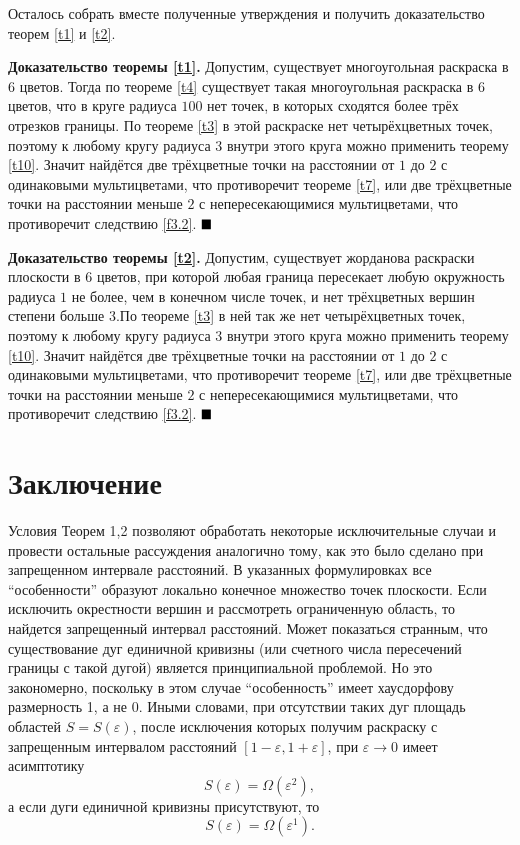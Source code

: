 \documentclass[12pt,a4paper]{article}
\renewcommand{\qed}{$\blacksquare \vspace{5mm}$}
\begin{document}
Осталось собрать вместе полученные утверждения и получить доказательство теорем \ref{t1} и \ref{t2}.

\textbf{Доказательство теоремы \ref{t1}.} Допустим, существует многоугольная раскраска в $6$ цветов. Тогда по теореме \ref{t4} существует такая многоугольная раскраска в $6$ цветов, что в круге радиуса $100$ нет точек, в которых сходятся более трёх отрезков границы. По теореме \ref{t3} в этой раскраске нет четырёхцветных точек, поэтому к любому кругу радиуса $3$ внутри этого круга можно применить теорему \ref{t10}. Значит найдётся две трёхцветные точки на расстоянии от $1$ до $2$ с одинаковыми мультицветами, что противоречит теореме \ref{t7}, или две трёхцветные точки на расстоянии меньше $2$ с непересекающимися мультицветами, что противоречит следствию \ref{f3.2}. \qed

\textbf{Доказательство теоремы \ref{t2}.} Допустим, существует жорданова раскраски плоскости в $6$ цветов, при которой любая граница пересекает любую окружность радиуса $1$ не более, чем в конечном числе точек, и нет трёхцветных вершин степени больше $3$.По теореме \ref{t3} в ней так же нет четырёхцветных точек, поэтому к любому кругу радиуса $3$ внутри этого круга можно применить теорему \ref{t10}. Значит найдётся две трёхцветные точки на расстоянии от $1$ до $2$ с одинаковыми мультицветами, что противоречит теореме \ref{t7}, или две трёхцветные точки на расстоянии меньше $2$ с непересекающимися мультицветами, что противоречит следствию \ref{f3.2}. \qed

\section{Заключение}

Условия Теорем 1,2 позволяют обработать некоторые исключительные случаи и провести остальные рассуждения аналогично тому, как это было сделано при запрещенном интервале расстояний. В указанных формулировках все ``особенности'' образуют локально конечное множество точек плоскости. Если исключить окрестности вершин и рассмотреть ограниченную область, то найдется запрещенный интервал расстояний. Может показаться странным, что существование дуг единичной кривизны (или счетного числа пересечений границы с такой дугой) является принципиальной проблемой. Но это закономерно, поскольку в этом случае ``особенность'' имеет хаусдорфову размерность 1, а не 0. Иными словами, при отсутствии таких дуг площадь областей $S = S(\varepsilon)$, после исключения которых получим раскраску с запрещенным интервалом расстояний $[1-\varepsilon, 1+\varepsilon]$, при $\varepsilon\to 0$ имеет асимптотику
$$S(\varepsilon)=\Omega(\varepsilon^2),$$
а если дуги единичной кривизны присутствуют, то
$$S(\varepsilon)=\Omega(\varepsilon^1).$$
\end{document}
